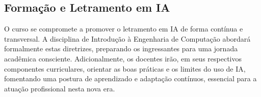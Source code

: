 \subsection{Formação e Letramento em IA}

O curso se compromete a promover o letramento em IA de forma contínua e transversal. A disciplina de Introdução à Engenharia de Computação abordará formalmente estas diretrizes, preparando os ingressantes para uma jornada acadêmica consciente. Adicionalmente, os docentes irão, em seus respectivos componentes curriculares, orientar as boas práticas e os limites do uso de IA, fomentando uma postura de aprendizado e adaptação contínuos, essencial para a atuação profissional nesta nova era.
